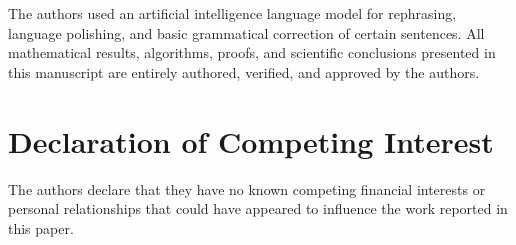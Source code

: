 \documentclass[11pt]{article}
\begin{document}
	The authors used an artificial intelligence language model for rephrasing,
	language polishing, and basic grammatical correction of certain sentences. All
	mathematical results, algorithms, proofs, and scientific conclusions presented
	in this manuscript are entirely authored, verified, and approved by the authors.
	
	\section*{Declaration of Competing Interest}
	
	The authors declare that they have no known competing financial interests or
	personal relationships that could have appeared to influence the work reported
	in this paper.
	
	
	
	
	
	
	
	
	
	
\end{document}
